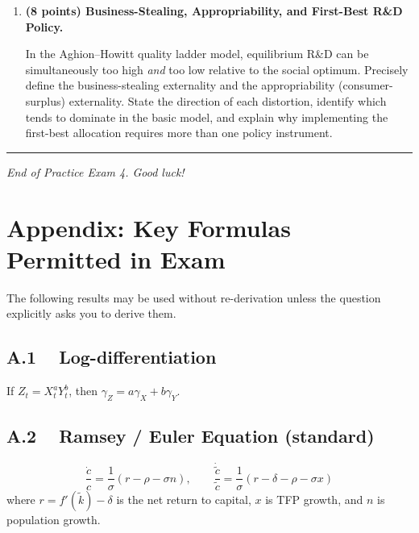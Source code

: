 \documentclass[a4paper,11pt]{article}
\newcommand{\ktilde}{\tilde{k}}
\newcommand{\ctilde}{\tilde{c}}
\begin{document}
\begin{enumerate}[label=\textbf{\arabic*.}, leftmargin=*, itemsep=14pt]
    \item \textbf{(8 points) Business-Stealing, Appropriability, and First-Best R\&D Policy.}

    In the Aghion--Howitt quality ladder model, equilibrium R\&D can be simultaneously too
    high \emph{and} too low relative to the social optimum.  Precisely define the
    business-stealing externality and the appropriability (consumer-surplus) externality.
    State the direction of each distortion, identify which tends to dominate in the basic
    model, and explain why implementing the first-best allocation requires more than one
    policy instrument.

\end{enumerate}

\vspace{20pt}
\noindent\rule{\textwidth}{0.4pt}

\begin{center}
    \textit{End of Practice Exam 4. Good luck!}
\end{center}

\clearpage
\appendix
\section*{Appendix: Key Formulas Permitted in Exam}

The following results may be used without re-derivation unless the question explicitly asks
you to derive them.

\subsection*{A.1 ~ Log-differentiation}
If $Z_t = X_t^a Y_t^b$, then $\gamma_Z = a\gamma_X + b\gamma_Y$.

\subsection*{A.2 ~ Ramsey / Euler Equation (standard)}
\[
    \frac{\dot{c}}{c} = \frac{1}{\sigma}(r - \rho - \sigma n),
    \qquad
    \frac{\dot{\ctilde}}{\ctilde} = \frac{1}{\sigma}(r - \delta - \rho - \sigma x)
\]
where $r = f'(\ktilde) - \delta$ is the net return to capital, $x$ is TFP growth, and
$n$ is population growth.
\end{document}

